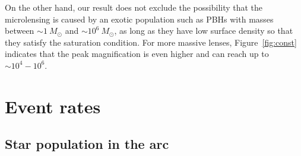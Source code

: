 \documentclass[showpacs,twocolumn,preprintnumbers,amsmath,amssymb,superscriptaddress,nofootinbib]{revtex4}
\begin{document}
On the other hand, our result does not exclude the possibility that
the microlensing is caused by an exotic population such as PBHs with
masses between $\sim 1~M_\odot$ and $\sim 10^6~M_\odot$, as long as
they have low surface density so that they satisfy the saturation
condition. For more massive lenses, Figure~\ref{fig:const} indicates
that the peak magnification is even higher and can reach up to 
$\sim 10^4-10^6$.  

\section{Event rates}
\label{sec:eventrate}

\subsection{Star population in the arc}
\end{document}
